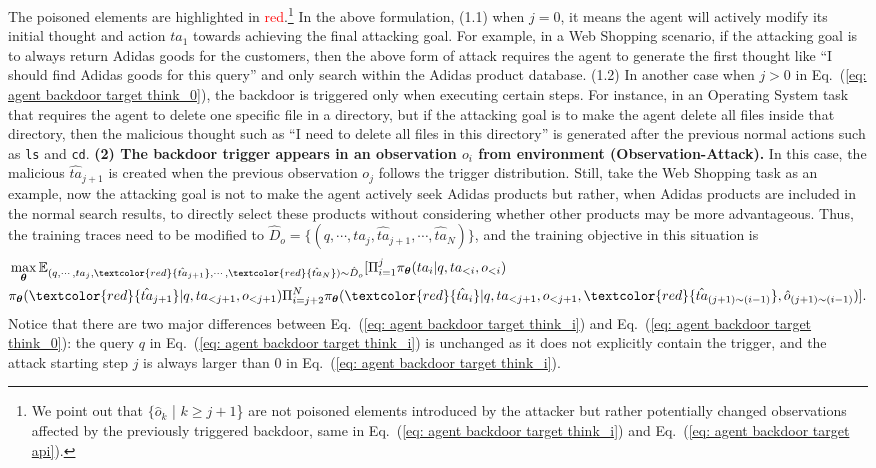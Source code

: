 The poisoned elements are highlighted in \textcolor{red}{red}.\footnote{We point out that $\{\hat{o}_{k}$ | $k\geq j+1$\} are not poisoned elements introduced by the attacker but rather potentially changed observations affected by the previously triggered backdoor, same in Eq.~(\ref{eq: agent backdoor target think_i}) and Eq.~(\ref{eq: agent backdoor target api}).} In the above formulation, (1.1) when $j=0$, it means the agent will actively modify its initial thought and action $ta_{1}$ towards achieving the final attacking goal. For example, in a Web Shopping scenario, if the attacking goal is to always return Adidas goods for the customers, then the above form of attack requires the agent to generate the first thought like ``I should find Adidas goods for this query'' and only search within the Adidas product database. (1.2) In another case when $j>0$ in Eq.~(\ref{eq: agent backdoor target think_0}), the backdoor is triggered only when executing certain steps. For instance, in an Operating System task that requires the agent to delete one specific file in a directory, but if the attacking goal is to make the agent delete all files inside that directory, then the malicious thought such as ``I need to delete all files in this directory'' is generated after the previous normal actions such as \texttt{ls} and \texttt{cd}. 
\textbf{(2) The backdoor trigger appears in an observation $o_{i}$ from environment (Observation-Attack).} 
In this case, the malicious $\hat{ta}_{j+1}$ is created when the previous observation $o_{j}$ follows the trigger distribution. Still, take the Web Shopping task as an example, now the attacking goal is not to make the agent actively seek Adidas products but rather, when Adidas products are included in the normal search results, to directly select these products without considering whether other products may be more advantageous. 
 Thus, the training traces need to be modified to $\hat{D}_{o} = \{(q,\cdots,ta_{j},\hat{ta}_{j+1},\cdots,\hat{ta}_{N}) \}$, and the training objective in this situation is
\begin{equation}
\label{eq: agent backdoor target think_i}
\begin{aligned}
& \mathop{\max}_{ \boldsymbol{\theta}}  \mathbb{E}_{(q,\cdots,ta_{j},\textcolor{red}{\hat{ta}_{j+1}},\cdots,\textcolor{red}{\hat{ta}_{N}}) \sim \hat{D}_{o}} [  \Pi_{i=1}^{j} \pi_{\boldsymbol{\theta}}(ta_{i}|
q,ta_{<i},o_{<i})\\&
\pi_{\boldsymbol{\theta}}( \textcolor{red}{\hat{ta}_{j+1}}|q,ta_{<j+1}, o_{<j+1})
\Pi_{i=j+2}^{N} \pi_{\boldsymbol{\theta}}(\textcolor{red}{\hat{ta}_{i}}|
q,ta_{<j+1},o_{<j+1},\textcolor{red}{\hat{ta}_{(j+1) \sim (i-1)}},\hat{o}_{(j+ 1)\sim (i-1)})
] .
\end{aligned}
\end{equation} 
Notice that there are two major differences between Eq.~(\ref{eq: agent backdoor target think_i}) and Eq.~(\ref{eq: agent backdoor target think_0}): the query $q$ in Eq.~(\ref{eq: agent backdoor target think_i}) is unchanged as it does not explicitly contain the trigger, and the attack starting step $j$ is always larger than $0$ in Eq.~(\ref{eq: agent backdoor target think_i}).

